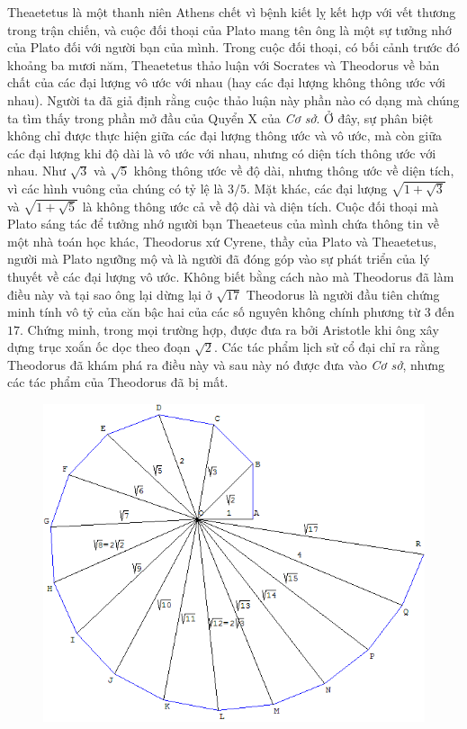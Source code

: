 \begin{multicols}{2}
		\vskip 0.1cm
		Theaetetus là một thanh niên Athens chết vì bệnh kiết lỵ kết hợp với vết thương trong trận chiến, và cuộc đối thoại của Plato mang tên ông là một sự tưởng nhớ của Plato đối với người bạn của mình.
		\vskip 0.1cm
		Trong cuộc đối thoại, có bối cảnh trước đó khoảng ba mươi năm, Theaetetus thảo luận với Socrates và Theodorus về bản chất của các đại lượng vô ước với nhau (hay các đại lượng không thông ước với nhau). Người ta đã giả định rằng cuộc thảo luận này phần nào có dạng mà chúng ta tìm thấy trong phần mở đầu của Quyển X của \textit{Cơ sở}.
		\vskip 0.1cm
		Ở đây, sự phân biệt không chỉ được thực hiện giữa các đại lượng thông ước và vô ước, mà còn giữa các đại lượng khi độ dài là vô ước với nhau, nhưng có diện tích thông ước với nhau. Như $\sqrt{3}$  và $\sqrt{5}$  không thông ước về độ dài, nhưng thông ước về diện tích, vì các hình vuông của chúng có tỷ lệ là $3/5$.
		\vskip 0.1cm
		Mặt khác, các đại lượng  $\sqrt{1 + \sqrt{3}}$  và $\sqrt{1 + \sqrt{5}}$ là không thông ước cả về độ dài và diện tích.
		\vskip 0.1cm
		Cuộc đối thoại mà Plato sáng tác để tưởng nhớ người bạn Theaeteus của mình chứa thông tin về một nhà toán học khác, Theodorus xứ Cyrene, thầy của Plato và Theaetetus, người mà Plato ngưỡng mộ và là người đã đóng góp vào sự phát triển của lý thuyết về các đại lượng vô ước. 
		\vskip 0.1cm
		Không biết bằng cách nào mà Theodorus đã làm điều này và tại sao ông lại dừng lại ở $\sqrt{17}$ 
		\vskip 0.1cm
		Theodorus là người đầu tiên chứng minh tính vô tỷ của căn bậc hai của các số nguyên không chính phương từ $3$ đến $17$.	 
		\vskip 0.1cm
		Chứng minh, trong mọi trường hợp, được đưa ra bởi Aristotle khi ông xây dựng trục xoắn ốc dọc theo đoạn $\sqrt{2}$. Các tác phẩm lịch sử cổ đại chỉ ra rằng Theodorus đã khám phá ra điều này và sau này nó được đưa vào \textit{Cơ sở}, nhưng các tác phẩm của Theodorus đã bị mất. 
		\begin{figure}[H]
				\vspace*{-5pt}
				\centering
				\captionsetup{labelformat= empty, justification=centering}
				\includegraphics[width= 0.85\linewidth]{H8}

\end{figure}
\end{multicols}
